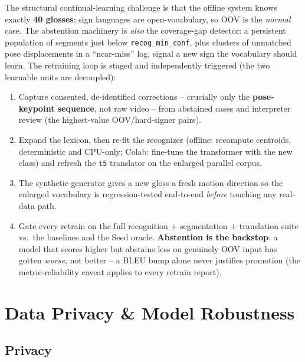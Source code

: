 \documentclass[12pt,a4paper]{article}
\begin{document}
The structural continual-learning challenge is that the offline system knows exactly \textbf{40 glosses}; sign languages are open-vocabulary, so OOV is the \emph{normal} case. The abstention machinery is \emph{also} the coverage-gap detector: a persistent population of segments just below \texttt{recog\_min\_conf}, plus clusters of unmatched pose displacements in a ``near-miss'' log, signal a new sign the vocabulary should learn. The retraining loop is staged and independently triggered (the two learnable units are decoupled):
\begin{enumerate}\setlength\itemsep{0.15em}
  \item Capture consented, de-identified corrections -- crucially only the \textbf{pose-keypoint sequence}, not raw video -- from abstained cases and interpreter review (the highest-value OOV/hard-signer pairs).
  \item Expand the lexicon, then re-fit the recognizer (offline: recompute centroids, deterministic and CPU-only; Colab: fine-tune the transformer with the new class) and refresh the \texttt{t5} translator on the enlarged parallel corpus.
  \item The synthetic generator gives a new gloss a fresh motion direction so the enlarged vocabulary is regression-tested end-to-end \emph{before} touching any real-data path.
  \item Gate every retrain on the full recognition + segmentation + translation suite vs.\ the baselines and the Seed oracle. \textbf{Abstention is the backstop}: a model that scores higher but abstains less on genuinely OOV input has gotten \emph{worse}, not better -- a BLEU bump alone never justifies promotion (the metric-reliability caveat applies to every retrain report).
\end{enumerate}

\section{Data Privacy \& Model Robustness}

\subsection{Privacy}
\end{document}
